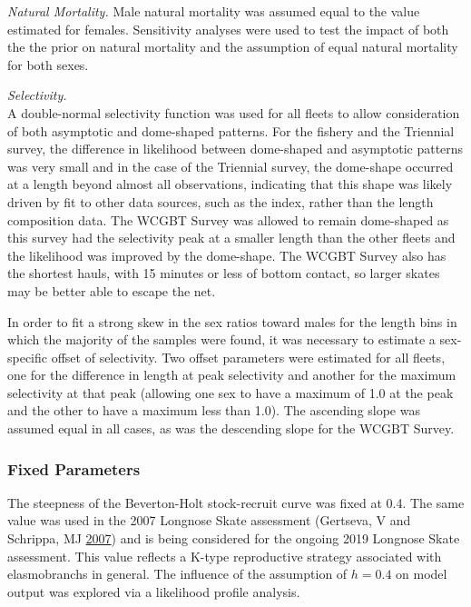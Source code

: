 \documentclass[12pt,]{article}
\begin{document}
\emph{Natural Mortality.} Male natural mortality was assumed equal to
the value estimated for females. Sensitivity analyses were used to test
the impact of both the the prior on natural mortality and the assumption
of equal natural mortality for both sexes.

\emph{Selectivity.}\\
A double-normal selectivity function was used for all fleets to allow
consideration of both asymptotic and dome-shaped patterns. For the
fishery and the Triennial survey, the difference in likelihood between
dome-shaped and asymptotic patterns was very small and in the case of
the Triennial survey, the dome-shape occurred at a length beyond almost
all observations, indicating that this shape was likely driven by fit to
other data sources, such as the index, rather than the length
composition data. The WCGBT Survey was allowed to remain dome-shaped as
this survey had the selectivity peak at a smaller length than the other
fleets and the likelihood was improved by the dome-shape. The WCGBT
Survey also has the shortest hauls, with 15 minutes or less of bottom
contact, so larger skates may be better able to escape the net.

In order to fit a strong skew in the sex ratios toward males for the
length bins in which the majority of the samples were found, it was
necessary to estimate a sex-specific offset of selectivity. Two offset
parameters were estimated for all fleets, one for the difference in
length at peak selectivity and another for the maximum selectivity at
that peak (allowing one sex to have a maximum of 1.0 at the peak and the
other to have a maximum less than 1.0). The ascending slope was assumed
equal in all cases, as was the descending slope for the WCGBT Survey.

\hypertarget{fixed-parameters}{%
\subsubsection{Fixed Parameters}\label{fixed-parameters}}

The steepness of the Beverton-Holt stock-recruit curve was fixed at 0.4.
The same value was used in the 2007 Longnose Skate assessment (Gertseva,
V and Schrippa, MJ \protect\hyperlink{ref-Gertseva2007}{2007}) and is
being considered for the ongoing 2019 Longnose Skate assessment. This
value reflects a K-type reproductive strategy associated with
elasmobranchs in general. The influence of the assumption of \(h=0.4\)
on model output was explored via a likelihood profile analysis.
\end{document}
